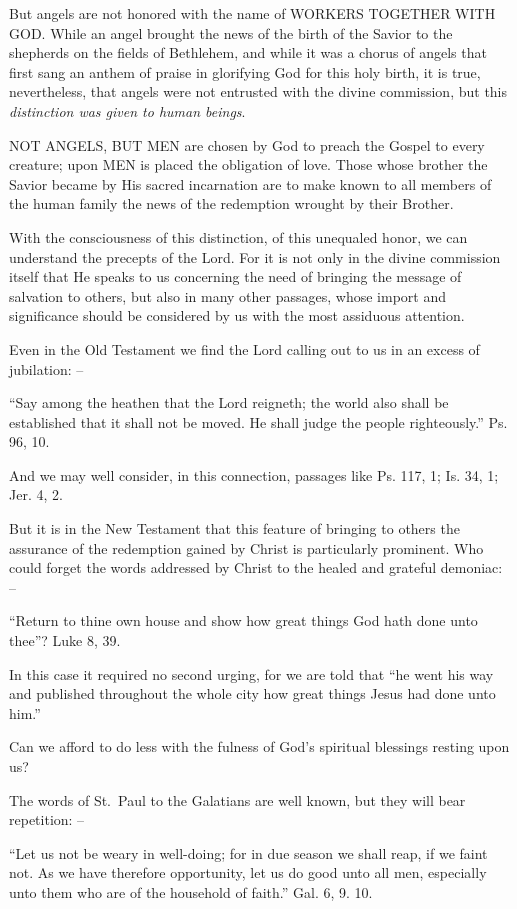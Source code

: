 \documentclass[
]{book}
\begin{document}
But angels are not honored with the name of WORKERS TOGETHER WITH GOD. While an angel brought the news of the birth of the Savior to the shepherds on the fields of Bethlehem, and while it was a chorus of angels that first sang an anthem of praise in glorifying God for this holy birth, it is true, nevertheless, that angels were not entrusted with the divine commission, but this \emph{distinction was given to human beings}.

NOT ANGELS, BUT MEN are chosen by God to preach the Gospel to every creature; upon MEN is placed the obligation of love. Those whose brother the Savior became by His sacred incarnation are to make known to all members of the human family the news of the redemption wrought by their Brother.

With the consciousness of this distinction, of this unequaled honor, we can understand the precepts of the Lord. For it is not only in the divine commission itself that He speaks to us concerning the need of bringing the message of salvation to others, but also in many other passages, whose import and significance should be considered by us with the most assiduous attention.

Even in the Old Testament we find the Lord calling out to us in an excess of jubilation: --

``Say among the heathen that the Lord reigneth; the world also shall be established that it shall not be moved. He shall judge the people righteously.'' Ps. 96, 10.

And we may well consider, in this connection, passages like Ps. 117, 1; Is. 34, 1; Jer. 4, 2.

But it is in the New Testament that this feature of bringing to others the assurance of the redemption gained by Christ is particularly prominent. Who could forget the words addressed by Christ to the healed and grateful demoniac: --

``Return to thine own house and show how great things God hath done unto thee''? Luke 8, 39.

In this case it required no second urging, for we are told that ``he went his way and published throughout the whole city how great things Jesus had done unto him.''

Can we afford to do less with the fulness of God's spiritual blessings resting upon us?

The words of St.~Paul to the Galatians are well known, but they will bear repetition: --

``Let us not be weary in well-doing; for in due season we shall reap, if we faint not. As we have therefore opportunity, let us do good unto all men, especially unto them who are of the household of faith.'' Gal. 6, 9. 10.
\end{document}
